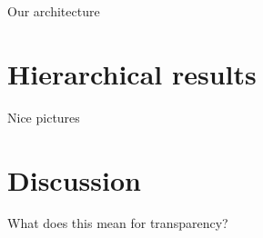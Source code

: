 \documentclass{beamer}[169]
\begin{document}
\begin{frame}{Our architecture}
    
\end{frame}


\section{Hierarchical results}
\begin{frame}{Nice pictures}
    
\end{frame}

\section{Discussion}
\begin{frame}{What does this mean for transparency? }
    
\end{frame}
\end{document}
